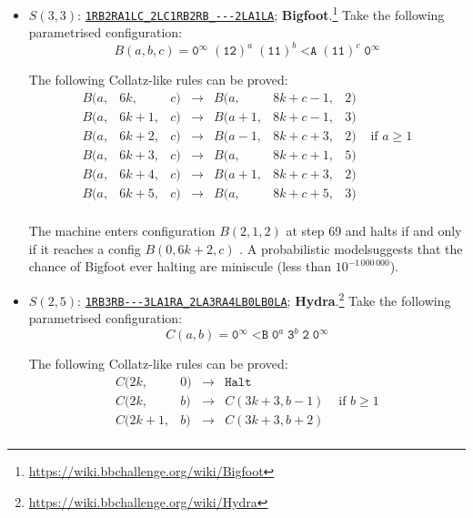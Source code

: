 \documentclass[a4paper,british]{article}
\theoremstyle{definition} %
\numberwithin{equation}{section}
\theoremstyle{definition} %
\newcommand{\tm}[1]{\href{https://bbchallenge.org/#1}{\texttt{\nolinkurl{#1}}}}
\newcommand{\szero}{\texttt{0}\xspace}
\newcommand{\sone}{\texttt{1}\xspace}
\begin{document}
\begin{itemize}
    \item $S(3,3)$: \tm{1RB2RA1LC_2LC1RB2RB_---2LA1LA}; \textbf{Bigfoot}.\footnote{\label{note:bigfoot}\url{https://wiki.bbchallenge.org/wiki/Bigfoot}} Take the following parametrised configuration:
          $$B(a,b,c) = \szero^\infty\; (\sone \texttt{2})^a \; (\sone \sone)^b \; \texttt{<A} \; (\sone \sone)^c \; \szero^\infty$$

          The following Collatz-like rules can be proved:
          \[
              \begin{array}{lllcllll}
                  B(a, & 6k,   & c) & \to & B(a,   & 8k + c - 1, & 2)                        \\
                  B(a, & 6k+1, & c) & \to & B(a+1, & 8k + c - 1, & 3)                        \\
                  B(a, & 6k+2, & c) & \to & B(a-1, & 8k + c + 3, & 2) & \text{ if } a \geq 1 \\
                  B(a, & 6k+3, & c) & \to & B(a,   & 8k + c + 1, & 5)                        \\
                  B(a, & 6k+4, & c) & \to & B(a+1, & 8k + c + 3, & 2)                        \\
                  B(a, & 6k+5, & c) & \to & B(a,   & 8k + c + 5, & 3)                        \\
              \end{array}
          \]

          The machine enters configuration $B(2,1,2)$ at step 69 and halts if and only if it reaches a config $B(0,6k+2,c)$ \cite{ligocki2023bb33}. A probabilistic model suggests that the chance of Bigfoot ever halting are miniscule (less than $10^{-1\,000\,000}$).

    \item $S(2,5)$: \tm{1RB3RB---3LA1RA_2LA3RA4LB0LB0LA}; \textbf{Hydra}.\footnote{\label{note:hydra}\url{https://wiki.bbchallenge.org/wiki/Hydra}} Take the following parametrised configuration:
          $$C(a,b) = \szero^\infty \; \texttt{<B} \; \szero^a \; \texttt{3}^b \; \texttt{2} \; \szero^\infty$$

          The following Collatz-like rules can be proved:
          \[
              \begin{array}{llcll}
                  C(2k,   & 0) & \longrightarrow & \texttt{Halt}                       \\
                  C(2k,   & b) & \longrightarrow & C(3k+3, b-1) & \text{ if } b \geq 1 \\
                  C(2k+1, & b) & \longrightarrow & C(3k+3, b+2)                        \\
              \end{array}
          \]


\end{itemize}
\end{document}
